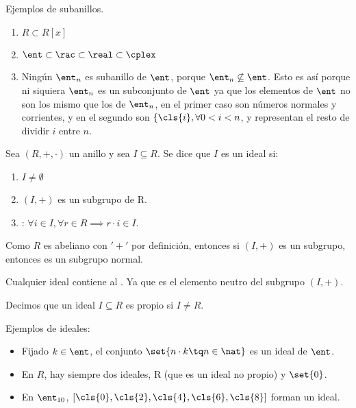 \begin{example} Ejemplos de subanillos.
	\begin{enumerate}
		\item $R \subset R[x]$
		\item $\ent \subset \rac \subset \real \subset \cplex$
		\item Ningún $\ent_n$ es subanillo de $\ent$, porque $\ent_n \not \subseteq \ent$. Esto es así porque ni siquiera $\ent_n$ es un subconjunto de $\ent$ ya que los elementos de $\ent$ no son los mismo que los de $\ent_n$, en el primer caso son números normales y corrientes, y en el segundo son $\{\cls{i},  \forall 0 < i < n$, y representan el resto de dividir $i$ entre $n$.
	\end{enumerate}
\end{example}


\begin{defn}[Ideal] %
Sea $(R,+,\cdot)$ un anillo y sea $I \subseteq R$. Se dice que $I$ es un ideal si:

	\begin{enumerate}
		\item $I \neq \emptyset$
		\item $(I, +)$ es un subgrupo de R.
		\item {}: $\forall i \in I, \forall r \in R \implies r\cdot i \in I$.
	\end{enumerate}
\end{defn}

\obs Como $R$ es abeliano con  $'+'$ por definición, entonces si $(I,+)$ es un subgrupo, entonces es un subgrupo normal.

\obs Cualquier ideal contiene al \zero. Ya que es el elemento neutro del subgrupo $(I,+)$.

\begin{defn}
	Decimos que un ideal $I \subseteq R$ es propio si $I \neq R$.
\end{defn}

\begin{example} Ejemplos de ideales:
	\begin{itemize}
		\item Fijado $k \in \ent$, el conjunto $\set{n\cdot k \tq n \in \nat }$ es un ideal de $\ent$.
		\item En $R$, hay siempre dos ideales, R (que es un ideal no propio) y $\set{0}$.
		\item En $\ent_{10}$, $[\cls{0},\cls{2},\cls{4},\cls{6},\cls{8} ]$ forman un ideal.
	\end{itemize}
\end{example}

